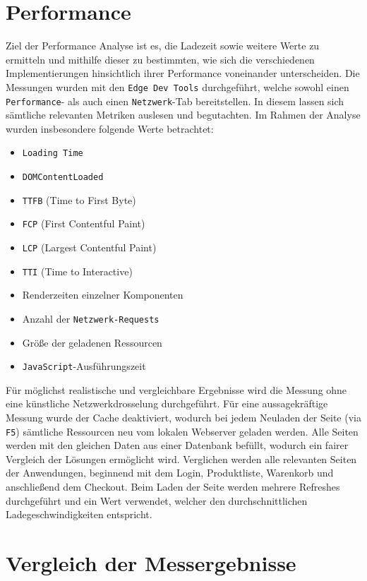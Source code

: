 \documentclass[oneside]{ausarbeitung}
\begin{document}
\section{Performance}
Ziel der Performance Analyse ist es, die Ladezeit sowie weitere Werte zu ermitteln und mithilfe dieser zu bestimmten, wie sich die verschiedenen Implementierungen hinsichtlich ihrer Performance voneinander unterscheiden.
Die Messungen wurden mit den \texttt{Edge Dev Tools} durchgeführt, welche sowohl einen \texttt{Performance}- als auch einen \texttt{Netzwerk}-Tab bereitstellen. In diesem lassen sich sämtliche relevanten Metriken auslesen und begutachten. Im Rahmen der Analyse wurden insbesondere folgende Werte betrachtet:
\begin{itemize}
  \item \texttt{Loading Time}
  \item \texttt{DOMContentLoaded}
  \item \texttt{TTFB} (Time to First Byte)
  \item \texttt{FCP} (First Contentful Paint)
  \item \texttt{LCP} (Largest Contentful Paint)
  \item \texttt{TTI} (Time to Interactive)
  \item Renderzeiten einzelner Komponenten
  \item Anzahl der \texttt{Netzwerk-Requests}
  \item Größe der geladenen Ressourcen
  \item \texttt{JavaScript}-Ausführungszeit
\end{itemize}

Für möglichst realistische und vergleichbare Ergebnisse wird die Messung ohne eine künstliche Netzwerkdrosselung durchgeführt. Für eine aussagekräftige Messung wurde der Cache deaktiviert, wodurch bei jedem Neuladen der Seite (via \texttt{F5}) sämtliche Ressourcen neu vom lokalen Webserver geladen werden. 
Alle Seiten werden mit den gleichen Daten aus einer Datenbank befüllt, wodurch ein fairer Vergleich der Lösungen ermöglicht wird. 
Verglichen werden alle relevanten Seiten der Anwendungen, beginnend mit dem Login, Produktliste, Warenkorb und anschließend dem Checkout.
Beim Laden der Seite werden mehrere Refreshes durchgeführt und ein Wert verwendet, welcher den durchschnittlichen Ladegeschwindigkeiten entspricht.

\section{Vergleich der Messergebnisse}
\end{document}
